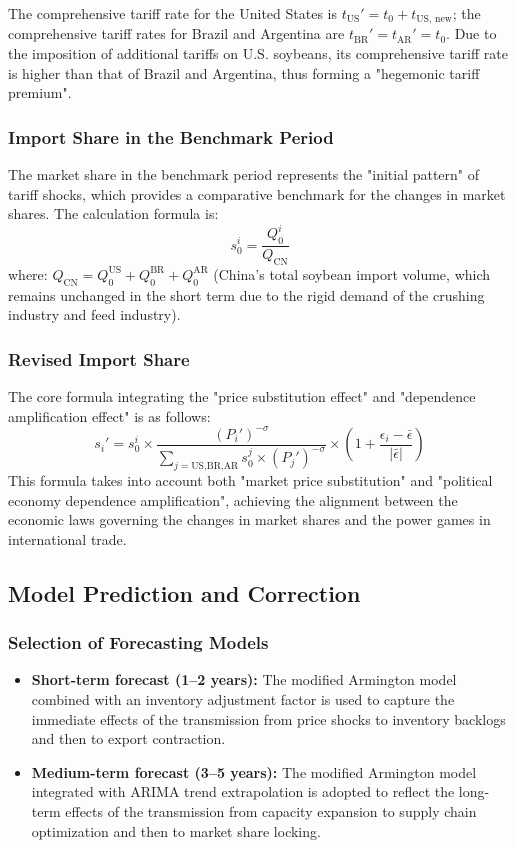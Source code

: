 \documentclass[12pt]{article}
\begin{document}
The comprehensive tariff rate for the United States is $t_{\text{US}}' = t_0 + t_{\text{US, new}}$; the comprehensive tariff rates for Brazil and Argentina are $t_{\text{BR}}' = t_{\text{AR}}' = t_0$. Due to the imposition of additional tariffs on U.S. soybeans, its comprehensive tariff rate is higher than that of Brazil and Argentina, thus forming a "hegemonic tariff premium".

\subsubsection{Import Share in the Benchmark Period}
The market share in the benchmark period represents the "initial pattern" of tariff shocks, which provides a comparative benchmark for the changes in market shares. The calculation formula is:
\begin{equation}
s_{0}^{i} = \frac{Q_{0}^{i}}{Q_{\text{CN}}}
\end{equation}
where: $Q_{\text{CN}} = Q_{0}^{\text{US}} + Q_{0}^{\text{BR}} + Q_{0}^{\text{AR}}$ (China's total soybean import volume, which remains unchanged in the short term due to the rigid demand of the crushing industry and feed industry).

\subsubsection{Revised Import Share}
The core formula integrating the "price substitution effect" and "dependence amplification effect" is as follows:
\[
s_i' = s_0^i \times \frac{(P_i')^{-\sigma}}{\sum_{j=\text{US,BR,AR}} s_0^j \times (P_j')^{-\sigma}} \times \left(1 + \frac{\epsilon_i - \bar{\epsilon}}{|\bar{\epsilon}|}\right)
\]
This formula takes into account both "market price substitution" and "political economy dependence amplification", achieving the alignment between the economic laws governing the changes in market shares and the power games in international trade.

\subsection{Model Prediction and Correction}

\subsubsection{Selection of Forecasting Models}
\begin{itemize}
    \item \textbf{Short-term forecast (1–2 years):} The modified Armington model combined with an inventory adjustment factor is used to capture the immediate effects of the transmission from price shocks to inventory backlogs and then to export contraction.
    \item \textbf{Medium-term forecast (3–5 years):} The modified Armington model integrated with ARIMA trend extrapolation is adopted to reflect the long-term effects of the transmission from capacity expansion to supply chain optimization and then to market share locking.
\end{itemize}
\end{document}
